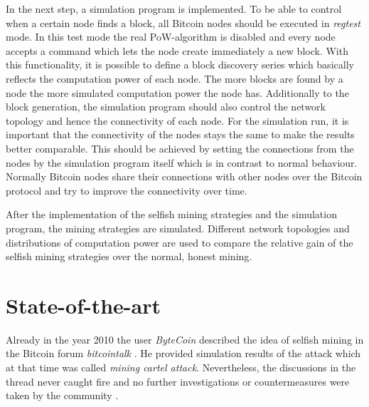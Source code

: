 \documentclass{scrartcl}
\begin{document}
In the next step, a simulation program is implemented.
To be able to control when a certain node finds a block, all Bitcoin nodes should be executed in \textit{regtest} mode.
In this test mode the real PoW-algorithm is disabled and every node accepts a command which lets the node create immediately a new block.
With this functionality, it is possible to define a block discovery series which basically reflects the computation power of each node.
The more blocks are found by a node the more simulated computation power the node has.
Additionally to the block generation, the simulation program should also control the network topology and hence the connectivity of each node.
For the simulation run, it is important that the connectivity of the nodes stays the same to make the results better comparable.
This should be achieved by setting the connections from the nodes by the simulation program itself which is in contrast to normal behaviour.
Normally Bitcoin nodes share their connections with other nodes over the Bitcoin protocol and try to improve the connectivity over time.

After the implementation of the selfish mining strategies and the simulation program, the mining strategies are simulated.
Different network topologies and distributions of computation power are used to compare the relative gain of the selfish mining strategies over the normal, honest mining.

\section{State-of-the-art}
Already in the year 2010 the user \textit{ByteCoin} described the idea of selfish mining in the Bitcoin forum \textit{bitcointalk} \cite{ByteCoin2010}.
He provided simulation results of the attack which at that time was called \textit{mining cartel attack}.
Nevertheless, the discussions in the thread never caught fire and no further investigations or countermeasures were taken by the community \cite{BitcoinTalk2010, bahack2013theoretical}.
\end{document}
